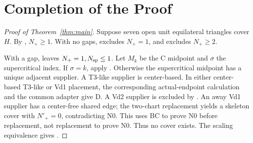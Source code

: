 \section{Completion of the Proof}
\label{sec:assembly}

\begin{proof}[Proof of Theorem~\ref{thm:main}]
Suppose seven open unit equilateral triangles cover $H$.
By , $N_+\ge1$.
With no gaps,  excludes $N_+=1$,
and  excludes $N_+\ge2$.

With a gap,  leaves $N_+=1,N_{\rm sp}\le1$.
Let $M_k$ be the C midpoint and $\sigma$ the supercritical index.
If $\sigma=k$, apply .
Otherwise the supercritical midpoint has a unique adjacent supplier.
A T3-like supplier is center-based. In either center-based T3-like or
Vd1 placement, the corresponding actual-endpoint calculation
and the common adapter  give D.
A Vd2 supplier is excluded by .
An away Vd1 supplier has a center-free shared edge; the two-chart
replacement  yields a
skeleton cover with $N'_+=0$, contradicting N0. This uses BC to prove
N0 before replacement, not replacement to prove N0.
Thus no cover exists. The scaling equivalence
 gives .
\end{proof}
